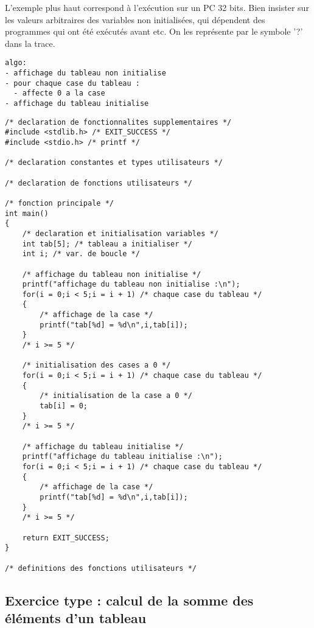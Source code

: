 \begin{correction}
L'exemple plus haut correspond à l'exécution sur un PC 32 bits. Bien insister sur les valeurs arbitraires des variables non initialisées, qui dépendent des programmes qui ont été exécutés avant etc. On les représente par le symbole '?' dans la trace.

\begin{verbatim}
algo:
- affichage du tableau non initialise
- pour chaque case du tableau :
  - affecte 0 a la case
- affichage du tableau initialise

\end{verbatim}
\begin{verbatim}
/* declaration de fonctionnalites supplementaires */
#include <stdlib.h> /* EXIT_SUCCESS */
#include <stdio.h> /* printf */

/* declaration constantes et types utilisateurs */

/* declaration de fonctions utilisateurs */

/* fonction principale */
int main()
{
    /* declaration et initialisation variables */
    int tab[5]; /* tableau a initialiser */
    int i; /* var. de boucle */

    /* affichage du tableau non initialise */
    printf("affichage du tableau non initialise :\n");
    for(i = 0;i < 5;i = i + 1) /* chaque case du tableau */
    {
        /* affichage de la case */
        printf("tab[%d] = %d\n",i,tab[i]);
    }
    /* i >= 5 */

    /* initialisation des cases a 0 */
    for(i = 0;i < 5;i = i + 1) /* chaque case du tableau */
    {
        /* initialisation de la case a 0 */
        tab[i] = 0;
    }
    /* i >= 5 */

    /* affichage du tableau initialise */
    printf("affichage du tableau initialise :\n");
    for(i = 0;i < 5;i = i + 1) /* chaque case du tableau */
    {
        /* affichage de la case */
        printf("tab[%d] = %d\n",i,tab[i]);
    }
    /* i >= 5 */

    return EXIT_SUCCESS;
}

/* definitions des fonctions utilisateurs */

\end{verbatim}
\end{correction}

\subsection{Exercice type : calcul de la somme des éléments d'un tableau}

